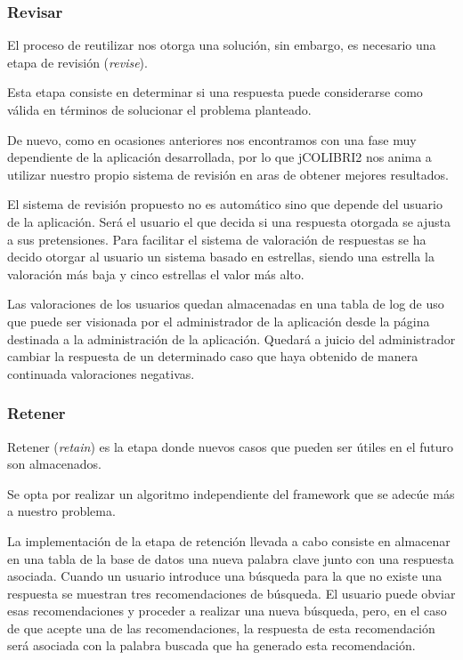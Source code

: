 \subsubsection{Revisar}\label{Revisar}

El proceso de reutilizar nos otorga una solución, sin embargo, es necesario una etapa de revisión (\emph{revise}).

Esta etapa consiste en determinar si una respuesta puede considerarse como válida en términos de solucionar el problema planteado.

De nuevo, como en ocasiones anteriores nos encontramos con una fase muy dependiente de la aplicación desarrollada, por lo que jCOLIBRI2 nos anima a utilizar nuestro propio sistema de revisión en aras de obtener mejores resultados.

El sistema de revisión propuesto no es automático sino que depende del usuario de la aplicación. Será el usuario el que decida si una respuesta otorgada se ajusta a sus pretensiones. Para facilitar el sistema de valoración de respuestas se ha decido otorgar al usuario un sistema basado en estrellas, siendo una estrella la valoración más baja y cinco estrellas el valor más alto.

Las valoraciones de los usuarios quedan almacenadas en una tabla de log de uso que puede ser visionada por el administrador de la aplicación desde la página destinada a la administración de la aplicación. Quedará a juicio del administrador cambiar la respuesta de un determinado caso que haya obtenido de manera continuada valoraciones negativas.

\subsubsection{Retener}\label{retener}

Retener (\emph{retain}) es la etapa donde nuevos casos que pueden ser útiles en el futuro son almacenados.

Se opta por realizar un algoritmo independiente del framework que se adecúe más a nuestro problema.

La implementación de la etapa de retención llevada a cabo consiste en almacenar en una tabla de la base de datos una nueva palabra clave junto con una respuesta asociada. Cuando un usuario introduce una búsqueda para la que no existe una respuesta se muestran tres recomendaciones de búsqueda. El usuario puede obviar esas recomendaciones y proceder a realizar una nueva búsqueda, pero, en el caso de que acepte una de las recomendaciones, la respuesta de esta recomendación será asociada con la palabra buscada que ha generado esta recomendación.

